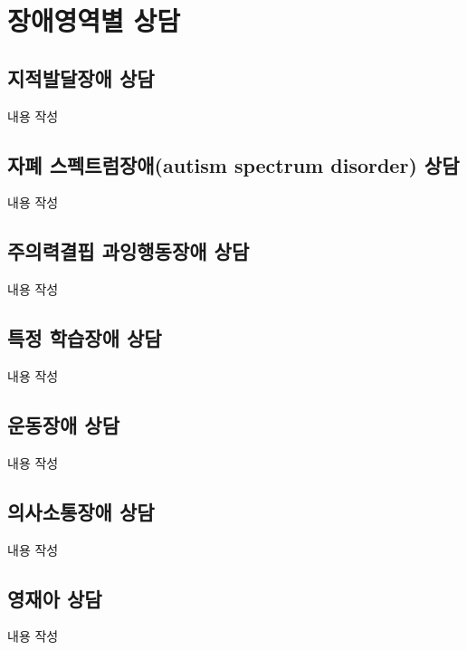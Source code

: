 \section{장애영역별 상담}

\subsection{지적발달장애 상담}
내용 작성

\subsection{자폐 스펙트럼장애(autism spectrum disorder) 상담}
내용 작성

\subsection{주의력결핍 과잉행동장애 상담}
내용 작성

\subsection{특정 학습장애 상담}
내용 작성

\subsection{운동장애 상담}
내용 작성

\subsection{의사소통장애 상담}
내용 작성

\subsection{영재아 상담}
내용 작성
